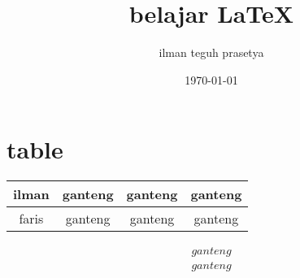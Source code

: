\documentclass[12pt]{article}
\begin{document}
	\title{belajar \LaTeX}
	\author{ilman teguh prasetya}
	\date{\today}
	\maketitle
	\section{table}
		\begin{tabular}{|c|c|c|c|}
		\hline
		ilman & ganteng & ganteng & ganteng \\ \hline
		faris & ganteng & ganteng & ganteng \\ \hline
		\end{tabular}
		\begin{eqnarray}
		ganteng\\
		ganteng\\
		\end{eqnarray}
		
\end{document}
